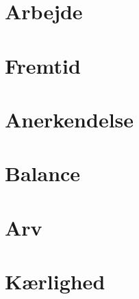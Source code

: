 \documentclass[12pt]{book}
\begin{document}
\chapter{Arbejde}  %

\chapter{Fremtid}  %

\chapter{Anerkendelse}  %

\chapter{Balance}  %

\chapter{Arv}  %

\chapter{Kærlighed}  %

\end{document}
